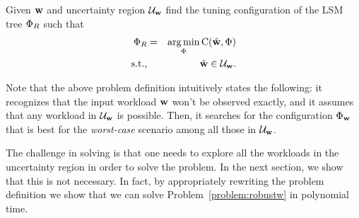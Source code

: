 \begin{problem}[{\robustw}]\label{problem:robustw} 
Given ${{\bf{w}}}$ and uncertainty region $\mathcal{U}_{{\bf{w}}}$ 
find the tuning configuration of the LSM tree ${{\Phi}}_R$ such that
\begin{eqnarray}
\label{eq:robust_workload_problem}
{{\ensuremath{\Phi}}}_R &=& \operatorname*{arg\,min}_{{{\Phi}}} {{\text{C}}}({{\hat{\bf{w}}}},
    {{\Phi}}) \nonumber\\
    \textrm{s.t.,}&& {{\hat{\bf{w}}}} \in \mathcal{U}_{{{\bf{w}}}}.
\end{eqnarray}
\end{problem}

Note that the above problem definition intuitively states the following: it recognizes that the input workload ${{\bf{w}}}$ won't
be observed exactly, and it assumes that any workload in $\mathcal{U}_{{\bf{w}}}$ is possible.  Then, it searches for the
configuration ${{\Phi}}_{{\bf{w}}}$ that is best for the \emph{worst-case} scenario among all those in $\mathcal{U}_{{\bf{w}}}$. 

The challenge in solving {\robustw}  is that one needs to explore all the workloads in the uncertainty region
in order to solve the problem.  In the next section, we show that this is not necessary.  In fact, by appropriately rewriting 
the problem definition we show that we can solve Problem~\ref{problem:robustw} in polynomial time.


%
